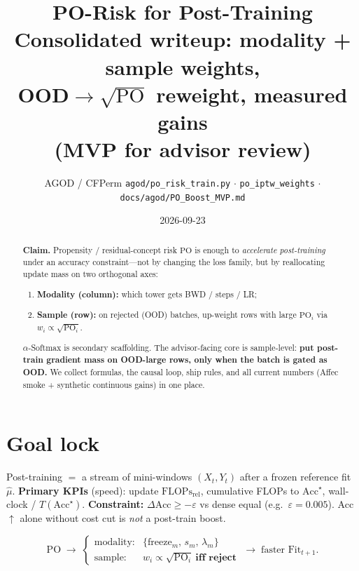 \documentclass[11pt]{article}
\title{\textbf{PO-Risk for Post-Training}\\[0.4em]
\large Consolidated writeup: modality + sample weights,\\[0.1em]
\large OOD$\to\sqrt{\mathrm{PO}}$ reweight, measured gains\\[0.15em]
\large (MVP for advisor review)}
\author{AGOD / CFPerm \quad \texttt{agod/po\_risk\_train.py} $\cdot$
\texttt{po\_iptw\_weights} $\cdot$ \texttt{docs/agod/PO\_Boost\_MVP.md}}
\date{2026-09-23}
\newcommand{\PO}{\mathrm{PO}}
\newcommand{\Flops}{\mathrm{FLOPs}_{\mathrm{rel}}}
\newcommand{\Acc}{\mathrm{Acc}}
\begin{document}
\maketitle

\begin{abstract}
\textbf{Claim.}
Propensity / residual-concept risk $\PO$ is enough to \emph{accelerate
post-training} under an accuracy constraint---not by changing the loss
family, but by reallocating update mass on two orthogonal axes:
\begin{enumerate}[leftmargin=1.2em,itemsep=1pt]
  \item \textbf{Modality (column):} which tower gets BWD / steps / LR;
  \item \textbf{Sample (row):} on rejected (OOD) batches, up-weight
        rows with large $\PO_i$ via $w_i\propto\sqrt{\PO_i}$.
\end{enumerate}
$\alpha$-Softmax is secondary scaffolding.
The advisor-facing core is sample-level:
\textbf{put post-train gradient mass on OOD-large rows, only when the
batch is gated as OOD.}
We collect formulas, the causal loop, ship rules, and all current
numbers (Affec smoke + synthetic continuous gains) in one place.
\end{abstract}

\tableofcontents
\vspace{0.8em}

\section{Goal lock}
\label{sec:goal}

Post-training $=$ a stream of mini-windows $(X_t,Y_t)$ after a frozen
reference fit $\hat\mu$.
\textbf{Primary KPIs} (speed): update $\Flops$, cumulative FLOPs to
$\Acc^\star$, wall-clock / $T(\Acc^\star)$.
\textbf{Constraint:} $\Delta\Acc\ge-\varepsilon$ vs dense equal
(e.g.\ $\varepsilon=0.005$).
Acc$\uparrow$ alone without cost cut is \emph{not} a post-train boost.

\[
\boxed{
\PO
\;\longrightarrow\;
\begin{cases}
\text{modality:} &
  \{\mathrm{freeze}_m,\,s_m,\,\lambda_m\}\\[2pt]
\text{sample:} &
  w_i\propto\sqrt{\PO_i}\ \textbf{iff reject}
\end{cases}
\;\longrightarrow\;
\text{faster Fit}_{t+1}.
}
\]

\end{document}
